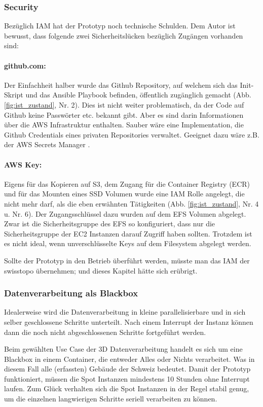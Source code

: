 \subsubsection{Security}
Bezüglich IAM hat der Prototyp noch technische Schulden. Dem Autor ist bewusst, dass folgende zwei Sicherheitslücken bezüglich Zugängen vorhanden sind:
\paragraph{github.com:} Der Einfachheit halber wurde das Github Repository, auf welchem sich das Init-Skript und das Ansible Playbook befinden, öffentlich zugänglich gemacht (Abb. \ref{fig:ist_zustand}, Nr. 2). Dies ist nicht weiter problematisch, da der Code auf Github keine Passwörter etc. bekannt gibt. Aber es sind darin Informationen über die AWS Infrastruktur enthalten. Sauber wäre eine Implementation, die Github Credentials eines privaten Repositories verwaltet. Geeignet dazu wäre z.B. der AWS Secrets Manager \cite{Secrets2020}.
\paragraph{AWS Key:} Eigens für das Kopieren auf S3, dem Zugang für die Container Registry (ECR) und für das Mounten eines SSD Volumen wurde eine IAM Rolle angelegt, die nicht mehr darf, als die eben erwähnten Tätigkeiten (Abb. \ref{fig:ist_zustand}, Nr. 4 u. Nr. 6). Der Zugangsschlüssel dazu wurden auf dem EFS Volumen abgelegt. Zwar ist die Sicherheitsgruppe des EFS so konfiguriert, dass nur die Sicherheitsgruppe der EC2 Instanzen darauf Zugriff haben sollten. Trotzdem ist es nicht ideal, wenn unverschlüsselte Keys auf dem Filesystem abgelegt werden.

Sollte der Prototyp in den Betrieb überführt werden, müsste man das IAM der swisstopo übernehmen; und dieses Kapitel hätte sich erübrigt.

\subsubsection{Datenverarbeitung als Blackbox}
Idealerweise wird die Datenverarbeitung in kleine parallelisierbare und in sich selber geschlossene Schritte unterteilt. Nach einem Interrupt der Instanz können dann die noch nicht abgeschlossenen Schritte fortgeführt werden. 

Beim gewählten Use Case der 3D Datenverarbeitung handelt es sich um eine Blackbox in einem Container, die entweder Alles oder Nichts verarbeitet. Was in diesem Fall alle (erfassten) Gebäude der Schweiz bedeutet. Damit der Prototyp funktioniert, müssen die Spot Instanzen mindestens 10 Stunden ohne Interrupt laufen. Zum Glück verhalten sich die Spot Instanzen in der Regel stabil genug, um die einzelnen langwierigen Schritte seriell verarbeiten zu können.

